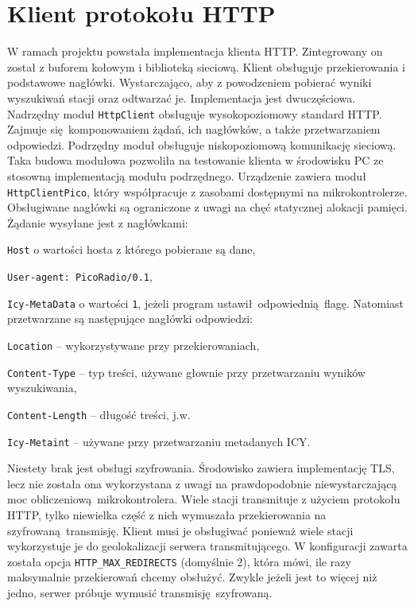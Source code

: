 \documentclass[polish]{aghengthesis}
\let\tempone\itemize
\let\temptwo\enditemize
\renewenvironment{itemize}{\tempone\setlength{\itemsep}{0cm}}{\temptwo}
\begin{document}
	\section{Klient protokołu HTTP}
		W ramach projektu powstała implementacja klienta HTTP. Zintegrowany on został z buforem kołowym i biblioteką sieciową.
		Klient obsługuje przekierowania i podstawowe nagłówki. Wystarczająco, aby z powodzeniem pobierać wyniki wyszukiwań stacji oraz odtwarzać je. Implementacja jest dwuczęściowa. Nadrzędny moduł \lstinline|HttpClient| obsługuje wysokopoziomowy standard HTTP. Zajmuje się komponowaniem żądań, ich nagłówków, a także przetwarzaniem odpowiedzi. Podrzędny moduł obsługuje niskopoziomową komunikację sieciową. Taka budowa modułowa pozwoliła na testowanie klienta w środowisku PC ze stosowną implementacją modułu podrzędnego. Urządzenie zawiera moduł \lstinline|HttpClientPico|, który współpracuje z zasobami dostępnymi na mikrokontrolerze.
		$ $\\
		
		Obsługiwane nagłówki są ograniczone z uwagi na chęć statycznej alokacji pamięci. Żądanie wysyłane jest z nagłówkami:
		\begin{itemize}
			\item \lstinline|Host| o wartości hosta z którego pobierane są dane,
			\item \lstinline|User-agent: PicoRadio/0.1|,
			\item \lstinline|Icy-MetaData| o wartości \lstinline|1|, jeżeli program ustawił odpowiednią flagę.
		\end{itemize}
		Natomiast przetwarzane są następujące nagłówki odpowiedzi:
		\begin{itemize}
			\item \lstinline|Location| -- wykorzystywane przy przekierowaniach,
			\item \lstinline|Content-Type| -- typ treści, używane głownie przy przetwarzaniu wyników wyszukiwania,
			\item \lstinline|Content-Length| -- długość treści, j.w.
			\item \lstinline|Icy-Metaint| -- używane przy przetwarzaniu metadanych ICY.
		\end{itemize}
		
		Niestety brak jest obsługi szyfrowania. Środowisko zawiera implementację TLS, lecz nie została ona wykorzystana z uwagi na prawdopodobnie niewystarczającą moc obliczeniową mikrokontrolera. Wiele stacji transmituje z użyciem protokołu HTTP, tylko niewielka część z nich wymuszała przekierowania na szyfrowaną transmisję. Klient musi je obsługiwać ponieważ wiele stacji wykorzystuje je do geolokalizacji serwera transmitującego. W konfiguracji zawarta została opcja \lstinline|HTTP_MAX_REDIRECTS| (domyślnie 2), która mówi, ile razy maksymalnie przekierowań chcemy obsłużyć. Zwykle jeżeli jest to więcej niż jedno, serwer próbuje wymusić transmisję szyfrowaną.
		
\end{document}
